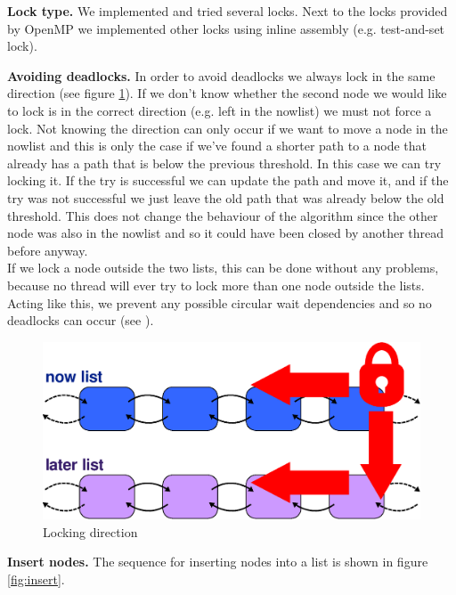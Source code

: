 \documentclass[letterpaper]{article}
\newcommand{\mypar}[1]{{\bf #1.}}
\begin{document}
\mypar{Lock type}
We implemented and tried several locks. Next to the locks provided by OpenMP we implemented other locks using inline assembly (e.g. test-and-set lock). 

\mypar{Avoiding deadlocks}
In order to avoid deadlocks we always lock in the same direction (see figure \ref{fig:lock}). If we don't know whether the second node we would like to lock is in the correct direction (e.g. left in the nowlist) we must not force a lock. Not knowing  the direction can only occur if we want to move a node in the nowlist and this is only the case if we've found a shorter path to a node that already has a path that is below the previous threshold. In this case we can try locking it. If the try is successful we can update the path and move it, and if the try was not successful we just leave the old path that was already below the old threshold. This does not change the behaviour of the algorithm since the other node was also in the nowlist and so it could have been closed by another thread before anyway. \\
If we lock a node outside the two lists, this can be done without any problems, because no thread will ever try to lock more than one node outside the lists.
Acting like this, we prevent any possible circular wait dependencies and so no deadlocks can occur (see \cite{Coffman:71}).

\begin{figure}[h]\centering
  \includegraphics[scale=0.38]{locking.eps}
  \caption{Locking direction \label{fig:lock}}
\end{figure}

\mypar{Insert nodes}
The sequence for inserting nodes into a list is shown in figure \ref{fig:insert}.
\end{document}
